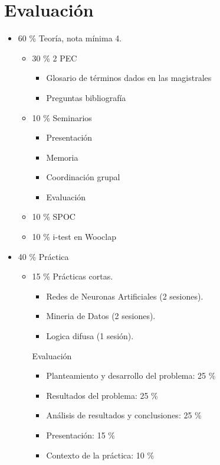 \documentclass[12pt, twoside, openright]{report} %
\begin{document}
\section{Evaluación}
\begin{itemize}
	\item 60 \% Teoría, nota mínima 4.
	      \begin{itemize}
		      \item 30 \% 2 PEC
		            \begin{itemize}
			            \item Glosario de términos dados en las magistrales
			            \item Preguntas bibliografía
		            \end{itemize}
		      \item 10 \% Seminarios
		            \begin{itemize}
			            \item Presentación
			            \item Memoria
			            \item Coordinación grupal
			            \item Evaluación
		            \end{itemize}
		      \item 10 \% SPOC
		      \item 10 \% i-test en Wooclap
	      \end{itemize}
	\item 40 \% Práctica
	      \begin{itemize}
		      \item 15 \% Prácticas cortas.
		            \begin{itemize}
			            \item Redes de Neuronas Artificiales (2 sesiones).
			            \item Mineria de Datos (2 sesiones).
			            \item Logica difusa (1 sesión).
		            \end{itemize}
		            Evaluación
		            \begin{itemize}
			            \item Planteamiento y desarrollo del problema: 25 \%
			            \item Resultados del problema: 25 \%
			            \item Análisis de resultados y conclusiones: 25 \%
			            \item Presentación: 15 \%
			            \item Contexto de la práctica: 10 \%

\end{itemize}
\end{itemize}
\end{itemize}
\end{document}
